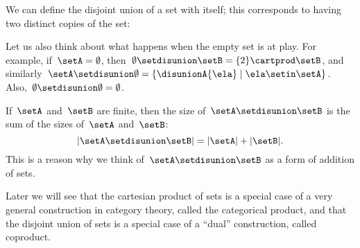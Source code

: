 We can define the disjoint union of a set with itself; this corresponds to having two distinct copies of the set:

Let us also think about what happens when the empty set is at play.
For example, if~$\setA = \emptyset$, then~$\emptyset \setdisunion \setB =  \{2\} \cartprod \setB$, and similarly~$\setA \setdisunion \emptyset =  \{ \disunionA{\ela} \mid \ela \setin\setA \}$.
Also,~$\emptyset \setdisunion \emptyset = \emptyset$.

\begin{remark}
    If~$\setA$ and~$\setB$ are finite, then the size of~$\setA \setdisunion \setB$ is the sum of the sizes of~$\setA$ and~$\setB$:
    \begin{equation*}
        \vert \setA \setdisunion \setB \vert = \vert \setA \vert + \vert \setB \vert.
    \end{equation*}
    This is a reason why we think of~$\setA \setdisunion \setB$ as a form of addition of sets.
\end{remark}

\begin{remark}
    Later we will see that the cartesian product of sets is a special case of a very general construction in category theory, called the categorical product, and that the disjoint union of sets is a special case of a ``dual'' construction, called coproduct.
\end{remark}
